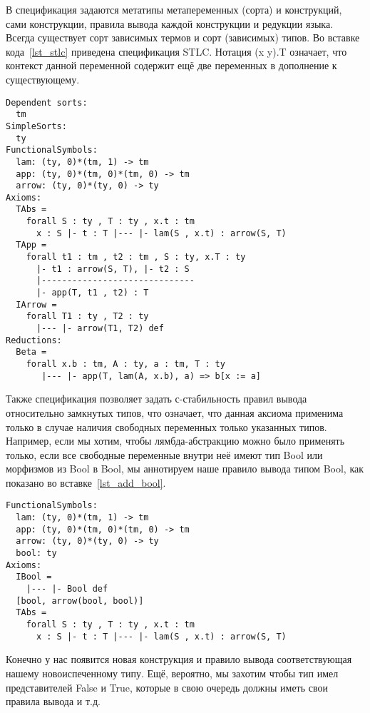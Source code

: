 В спецификация задаются метатипы метапеременных (сорта) и конструкций, сами конструкции, правила вывода каждой конструкции и редукции языка. Всегда существует сорт зависимых термов и сорт (зависимых) типов. Во вставке кода~\ref{lst_stlc} приведена спецификация STLC\cite{stlc}. Нотация (x y).T означает, что контекст данной переменной содержит ещё две переменных в дополнение к существующему.

\begin{lstlisting}[label={lst_stlc}, caption={Описание STLC при помощи языка специфкации},captionpos=b, frame=single, float, floatplacement=H]
Dependent sorts:
  tm
SimpleSorts:
  ty
FunctionalSymbols:
  lam: (ty, 0)*(tm, 1) -> tm
  app: (ty, 0)*(tm, 0)*(tm, 0) -> tm
  arrow: (ty, 0)*(ty, 0) -> ty
Axioms:
  TAbs =
    forall S : ty , T : ty , x.t : tm
      x : S |- t : T |--- |- lam(S , x.t) : arrow(S, T)
  TApp =
    forall t1 : tm , t2 : tm , S : ty, x.T : ty
      |- t1 : arrow(S, T), |- t2 : S
      |------------------------------
      |- app(T, t1 , t2) : T
  IArrow =
    forall T1 : ty , T2 : ty
      |--- |- arrow(T1, T2) def
Reductions:
  Beta =
    forall x.b : tm, A : ty, a : tm, T : ty
       |--- |- app(T, lam(A, x.b), a) => b[x := a]
\end{lstlisting}

Также спецификация позволяет задать с-стабильность правил вывода относительно замкнутых типов, что означает, что данная аксиома применима только в случае наличия свободных переменных только указанных типов. Например, если мы хотим, чтобы лямбда-абстракцию можно было применять только, если все свободные переменные внутри неё имеют тип Bool или морфизмов из Bool в Bool, мы аннотируем наше правило вывода типом Bool, как показано во вставке~\ref{lst_add_bool}.

\begin{lstlisting}[label={lst_add_bool}, caption={Пример спецификации того, что конструкция $\lambda$ должна быть стабильна относительно типа Bool и Bool $\rightarrow$ Bool},captionpos=b, frame=single, float, floatplacement=H]
FunctionalSymbols:
  lam: (ty, 0)*(tm, 1) -> tm
  app: (ty, 0)*(tm, 0)*(tm, 0) -> tm
  arrow: (ty, 0)*(ty, 0) -> ty
  bool: ty
Axioms:
  IBool =
    |--- |- Bool def
  [bool, arrow(bool, bool)]
  TAbs =
    forall S : ty , T : ty , x.t : tm
      x : S |- t : T |--- |- lam(S , x.t) : arrow(S, T)
\end{lstlisting}

Конечно у нас появится новая конструкция и правило вывода соответствующая нашему новоиспеченному типу. Ещё, вероятно, мы захотим чтобы тип имел представителей False и True, которые в свою очередь должны иметь свои правила вывода и т.д.

